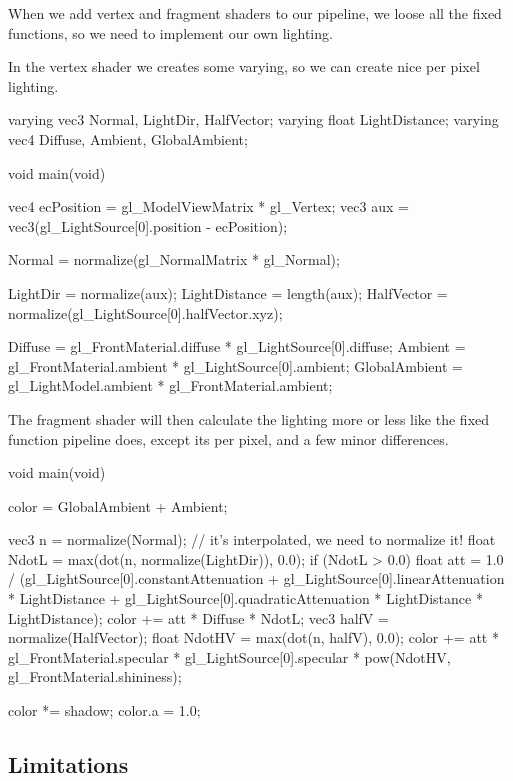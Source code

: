 When we add vertex and fragment shaders to our pipeline, we loose all
the fixed functions, so we need to implement our own lighting. 

In the vertex shader we creates some varying, so we can create nice
per pixel lighting.

\begin{cppcode}
varying vec3 Normal, LightDir, HalfVector;
varying float LightDistance;
varying vec4 Diffuse, Ambient, GlobalAmbient;

void main(void) {
    vec4 ecPosition = gl_ModelViewMatrix * gl_Vertex;
    vec3 aux = vec3(gl_LightSource[0].position - ecPosition);

    Normal = normalize(gl_NormalMatrix * gl_Normal);
    
    LightDir = normalize(aux);
    LightDistance = length(aux);
    HalfVector = normalize(gl_LightSource[0].halfVector.xyz);
    
    Diffuse = gl_FrontMaterial.diffuse * gl_LightSource[0].diffuse;
    Ambient = gl_FrontMaterial.ambient * gl_LightSource[0].ambient;
    GlobalAmbient = gl_LightModel.ambient * gl_FrontMaterial.ambient;
}
\end{cppcode}

The fragment shader will then calculate the lighting more or less like
the fixed function pipeline does, except its per pixel, and a few
minor differences.

\begin{cppcode}
void main(void) {
    color = GlobalAmbient + Ambient;
    
    vec3 n = normalize(Normal); // it's interpolated, we need to normalize it!
    float NdotL = max(dot(n, normalize(LightDir)), 0.0);
    if (NdotL > 0.0) {
        float att = 1.0 / 
        (gl_LightSource[0].constantAttenuation +
        gl_LightSource[0].linearAttenuation * LightDistance + 
        gl_LightSource[0].quadraticAttenuation * LightDistance * LightDistance);
        color += att * Diffuse * NdotL;
        vec3 halfV = normalize(HalfVector);
        float NdotHV = max(dot(n, halfV), 0.0);
        color += att * gl_FrontMaterial.specular 
        * gl_LightSource[0].specular
        * pow(NdotHV, gl_FrontMaterial.shininess);
    }

    color *= shadow;
    color.a = 1.0;

}
\end{cppcode}

\subsection{Limitations}


